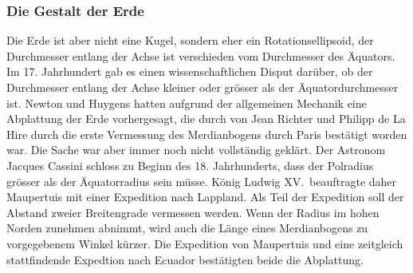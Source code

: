 %
%
\subsubsection{Die Gestalt der Erde}
Die Erde ist aber nicht eine Kugel, sondern eher ein Rotationsellipsoid,
der Durchmesser entlang der Achse ist verschieden vom Durchmesser des 
Äquators.
Im 17. Jahrhundert gab es einen wissenschaftlichen Disput darüber,
ob der Durchmesser entlang der Achse kleiner oder grösser als der
Äquatordurchmesser ist.
Newton und Huygens hatten aufgrund der allgemeinen Mechanik eine Abplattung
der Erde vorhergesagt, die durch von Jean Richter und Philipp de La Hire
durch die erste Vermessung des Merdianbogens durch Paris bestätigt 
worden war.
Die Sache war aber immer noch nicht vollständig geklärt.
Der Astronom Jacques Cassini schloss zu Beginn des 18. Jahrhunderts,
dass der Polradius grösser als der Äquatorradius sein müsse.
König Ludwig XV.~beauftragte daher Maupertuis mit einer Expedition
nach Lappland.
Als Teil der Expedition soll der Abstand zweier Breitengrade
vermessen werden.
Wenn der Radius im hohen Norden zunehmen abnimmt, wird auch die Länge
eines Merdianbogens zu vorgegebenem Winkel kürzer.
Die Expedition von Maupertuis und eine zeitgleich stattfindende Expedtion
nach Ecuador bestätigten beide die Abplattung.





